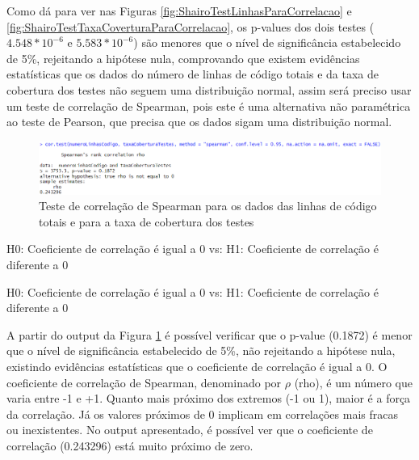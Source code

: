 Como dá para ver nas Figuras \ref{fig:ShairoTestLinhasParaCorrelacao} e \ref{fig:ShairoTestTaxaCoverturaParaCorrelacao}, os p-values dos dois testes ($4.548 * 10^{-6}$ e $5.583 * 10^{-6}$) são menores que o nível de significância estabelecido de 5\%, rejeitando a hipótese nula, comprovando que existem evidências estatísticas que os dados do número de linhas de código totais e da taxa de cobertura dos testes não seguem uma distribuição normal, assim será preciso usar um teste de correlação de Spearman, pois este é uma alternativa não paramétrica ao teste de Pearson, que precisa que os dados sigam uma distribuição normal.

\begin{figure}
    \centering
    \includegraphics[width=0.5\linewidth]{imagens//questao2/pergunta2TesteCorrelacaoSpearman.png}
    \caption{Teste de correlação de Spearman para os dados das linhas de código totais e para a taxa de cobertura dos testes}
    \label{fig:TesteCorrelacaoSpearmanPergunta2}
\end{figure}

\begin{center}
    H0: Coeficiente de correlação é igual a 0
    \newline
    vs:
    \newline
    H1: Coeficiente de correlação é diferente a 0
    \newline
\end{center}


\begin{center}
H0: Coeficiente de correlação é igual a 0 \hspace{1cm} vs: \hspace{1cm} H1: Coeficiente de correlação é diferente a 0
\end{center}

A partir do output da Figura \ref{fig:TesteCorrelacaoSpearmanPergunta2} é possível verificar que o p-value (0.1872) é menor que o nível de significância estabelecido de 5\%, não rejeitando a hipótese nula, existindo evidências estatísticas que o coeficiente de correlação é igual a 0.
O coeficiente de correlação de Spearman, denominado por $\rho $ (rho), é um número que varia entre -1 e +1. Quanto mais próximo dos extremos (-1 ou 1), maior é a força da correlação. Já os valores próximos de 0 implicam em correlações mais fracas ou inexistentes. No output apresentado, é possível ver que o coeficiente de correlação (0.243296) está muito próximo de zero.

